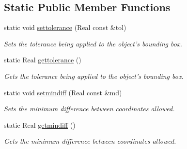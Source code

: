 \subsection*{Static Public Member Functions}
\begin{DoxyCompactItemize}
\item 
\hypertarget{classDomain_a9f354e2ea78a206e39fcc9147ce18306}{
static void \hyperlink{classDomain_a9f354e2ea78a206e39fcc9147ce18306}{settolerance} (Real const \&tol)}
\label{classDomain_a9f354e2ea78a206e39fcc9147ce18306}

\begin{DoxyCompactList}\small\item\em Sets the tolerance being applied to the object's bounding box. \item\end{DoxyCompactList}\item 
\hypertarget{classDomain_a5fd4935f50b740a3e797ccc4b9941996}{
static Real \hyperlink{classDomain_a5fd4935f50b740a3e797ccc4b9941996}{gettolerance} ()}
\label{classDomain_a5fd4935f50b740a3e797ccc4b9941996}

\begin{DoxyCompactList}\small\item\em Gets the tolerance being applied to the object's bounding box. \item\end{DoxyCompactList}\item 
\hypertarget{classDomain_a1a7384845ce66d75396430e5b8fb7c48}{
static void \hyperlink{classDomain_a1a7384845ce66d75396430e5b8fb7c48}{setmindiff} (Real const \&md)}
\label{classDomain_a1a7384845ce66d75396430e5b8fb7c48}

\begin{DoxyCompactList}\small\item\em Sets the minimum difference between coordinates allowed. \item\end{DoxyCompactList}\item 
\hypertarget{classDomain_acf5e11e0d0df920d381e4116f531bd16}{
static Real \hyperlink{classDomain_acf5e11e0d0df920d381e4116f531bd16}{getmindiff} ()}
\label{classDomain_acf5e11e0d0df920d381e4116f531bd16}

\begin{DoxyCompactList}\small\item\em Gets the minimum difference between coordinates allowed. \item\end{DoxyCompactList}\end{DoxyCompactItemize}
